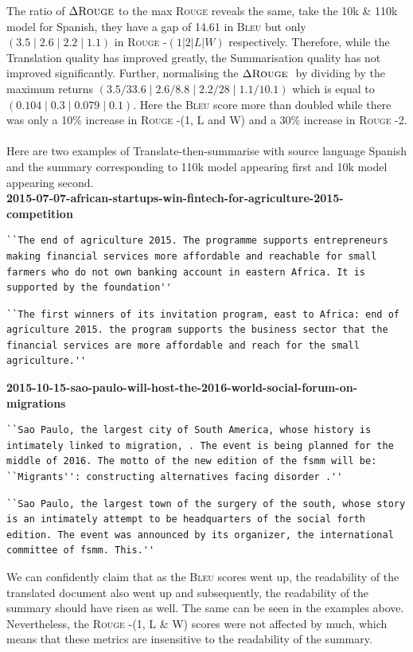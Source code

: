 \documentclass[12pt,a4paper,twoside,openright]{report}
\newcommand{\bleu}{\textsc{Bleu} }
\newcommand{\rouge}{\textsc{Rouge} }
\begin{document}
The ratio of $\Delta \rouge$ to the max \rouge reveals the same, take the 10k \& 110k model for Spanish, they have a gap of 14.61 in \bleu but only $(3.5\;|\;2.6\;|\;2.2\;|\;1.1)$ in \rouge-$(1|2|L|W)$ respectively. Therefore, while the Translation quality has improved greatly, the Summarisation quality has not improved significantly. Further, normalising the $\Delta \text{\rouge}$ by dividing by the maximum returns  $(3.5/33.6\;|\;2.6/8.8\;|\;2.2/28\;|\;1.1/10.1)$ which is equal to $(0.104\;|\;0.3\;|\;0.079\;|\;0.1)$. Here the \bleu score more than doubled while there was only a 10\% increase in \rouge-(1, L and W) and a 30\% increase in \rouge-2.
\\\\
Here are two examples of Translate-then-summarise with source language Spanish and the summary corresponding to 110k model appearing first and 10k model appearing second. \\
\textbf{2015-07-07-african-startups-win-fintech-for-agriculture-2015-competition}
\begin{lstlisting}
``The end of agriculture 2015. The programme supports entrepreneurs making financial services more affordable and reachable for small farmers who do not own banking account in eastern Africa. It is supported by the foundation''
\end{lstlisting}
\begin{lstlisting}
``The first winners of its invitation program, east to Africa: end of agriculture 2015. the program supports the business sector that the financial services are more affordable and reach for the small agriculture.''
\end{lstlisting}
\textbf{2015-10-15-sao-paulo-will-host-the-2016-world-social-forum-on-migrations}
\begin{lstlisting}
``Sao Paulo, the largest city of South America, whose history is intimately linked to migration, . The event is being planned for the middle of 2016. The motto of the new edition of the fsmm will be: ``Migrants'': constructing alternatives facing disorder .''
\end{lstlisting}
\begin{lstlisting}
``Sao Paulo, the largest town of the surgery of the south, whose story is an intimately attempt to be headquarters of the social forth edition. The event was announced by its organizer, the international committee of fsmm. This.''
\end{lstlisting}

We can confidently claim that as the \bleu scores went up, the readability of the translated document also went up and subsequently, the readability of the summary should have risen as well. The same can be seen in the examples above. Nevertheless, the \rouge-(1, L \& W) scores were not affected by much, which means that these metrics are insensitive to the readability of the summary.
\end{document}
